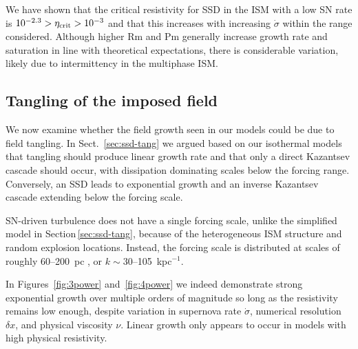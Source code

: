 \documentclass[preprint2]{aastex63}
\newcommand\dx{ {\delta x}}
\newcommand{\fg}[1]{\textcolor{midgreen}{#1}}
\newcommand{\mm}[1]{\textcolor{mypurple}{#1}}
\begin{document}
 \fg{We have shown that the critical resistivity for SSD in the ISM with a
 low SN rate is $10^{-2.3}>\eta_{\rm crit}>10^{-3}$ and
 that this increases with increasing
 $\dot\sigma$ within the range considered.
 Although higher Rm and Pm generally increase growth rate
 and saturation
 in line with theoretical expectations,
 there is considerable variation, likely due to intermittency in
   the multiphase ISM.}
 
 
\subsection{\fg{Tangling of the imposed field}} \label{sec:Balsara}

\mm{We now examine whether the field growth seen in our models could
  be due to field tangling.  In Sect.~\ref{sec:ssd-tang} we argued
  based on our isothermal models that tangling should produce linear
  growth rate and that only a direct
  Kazantsev cascade should occur, with dissipation dominating scales
  below the forcing range. Conversely, an SSD leads to exponential
  growth and an inverse Kazantsev cascade extending below the forcing scale.}

 SN-driven turbulence does not have a \mm{single} forcing scale, unlike the
 simplified model in Section\,\ref{sec:ssd-tang}, because of the
 heterogeneous ISM structure and random explosion locations.
 \mm{Instead, the} forcing scale \mm{is} distributed at scales
 \fg{of roughly 60--200~pc
   \citep{joung2006,avillez2007,HSSFG17}, or $k \sim 30$--105~kpc$^{-1}$}.

\mm{In Figures~\ref{fig:3power} and~\ref{fig:4power} we indeed demonstrate
strong exponential growth over multiple orders of magnitude so long as
the resistivity remains low enough, despite variation in supernova
rate $\dot\sigma$, numerical resolution $\dx$, and physical viscosity
$\nu$. Linear growth only appears to occur in models with high
physical resistivity.}
\end{document}
